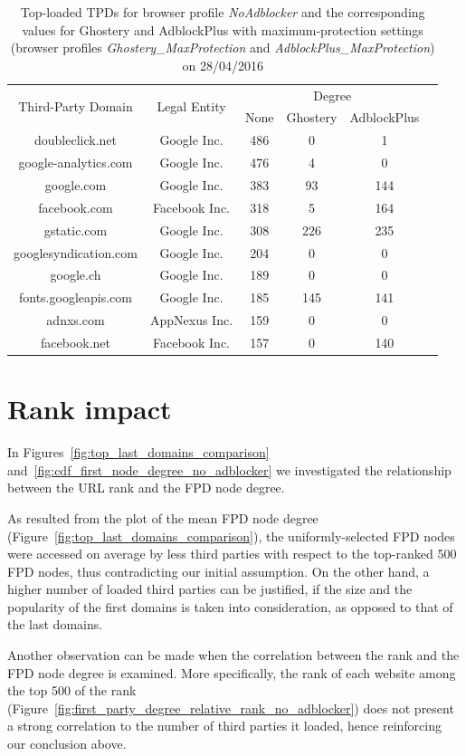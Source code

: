   \begin{table}
  \centering
  \begin{tabular}{|c|c|c|c|c|c|}
  \hline
    \multirow{2}{*}{Third-Party Domain} & \multirow{2}{*}{Legal Entity} & \multicolumn{3}{|c|}{Degree} \\
  \cline{3-5}
    & & \scriptsize{None} & \scriptsize{Ghostery} & \scriptsize{AdblockPlus} \\
  \hline
  doubleclick.net & Google Inc. & 486 & 0 & 1 \\
  google-analytics.com & Google Inc. & 476 & 4 & 0 \\
  google.com & Google Inc. & 383 & 93 & 144 \\
  facebook.com & Facebook Inc. & 318 & 5 & 164 \\
  gstatic.com & Google Inc. & 308 & 226 & 235 \\
  googlesyndication.com & Google Inc. & 204 & 0 & 0 \\
  google.ch & Google Inc. & 189 & 0 & 0 \\
  fonts.googleapis.com & Google Inc. & 185 & 145 & 141 \\
  adnxs.com & AppNexus Inc. & 159 & 0 & 0 \\
  facebook.net & Facebook Inc. & 157 & 0 & 140 \\
  \hline
  \end{tabular}
  \caption{Top-loaded TPDs for browser profile \textit{NoAdblocker} and the corresponding values for Ghostery and AdblockPlus with maximum-protection settings (browser profiles \textit{Ghostery\_MaxProtection} and \textit{AdblockPlus\_MaxProtection}) on 28/04/2016}
  \label{table:top_10_third_party_domains}
  \end{table}

\section{Rank impact}

In Figures~\ref{fig:top_last_domains_comparison} and~\ref{fig:cdf_first_node_degree_no_adblocker} we investigated the relationship between the URL rank and the FPD node degree.

As resulted from the plot of the mean FPD node degree (Figure~\ref{fig:top_last_domains_comparison}), the uniformly-selected FPD nodes were accessed on average by less third parties with respect to the top-ranked 500 FPD nodes, thus contradicting our initial assumption. On the other hand, a higher number of loaded third parties can be justified, if the size and the popularity of the first domains is taken into consideration, as opposed to that of the last domains.

Another observation can be made when the correlation between the rank and the FPD node degree is examined. More specifically, the rank of each website among the top 500 of the rank (Figure~\ref{fig:first_party_degree_relative_rank_no_adblocker}) does not present a strong correlation to the number of third parties it loaded, hence reinforcing our conclusion above.